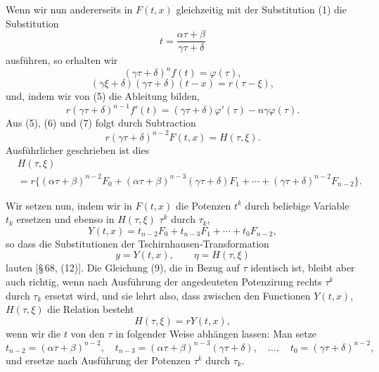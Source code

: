 \documentclass[11pt]{article}
\begin{document}
Wenn wir nun andererseits in $F(t,x)$ gleichzeitig mit der Substitution (1) die Substitution
\begin{equation}
 t=\frac{\alpha\tau+\beta}{\gamma\tau+\delta}
\tag{4}
\end{equation}
ausführen, so erhalten wir
\begin{equation}
 (\gamma\tau+\delta)^nf(t)=\varphi(\tau),
\tag{5}
\end{equation}
\begin{equation}
 (\gamma\xi+\delta)(\gamma\tau+\delta)(t-x)=r(\tau-\xi),
\tag{6}
\end{equation}
und, indem wir von (5) die Ableitung bilden,
\begin{equation}
 r(\gamma\tau+\delta)^{n-1}f'(t)=(\gamma\tau+\delta)\varphi'(\tau)-n\gamma\varphi(\tau).
\tag{7}
\end{equation}
Aus (5), (6) und (7) folgt durch Subtraction
\begin{equation}
 r(\gamma\tau+\delta)^{n-2}F(t,x)=H(\tau,\xi).
\tag{8}
\end{equation}
Ausführlicher geschrieben ist dies
\begin{equation}
\begin{aligned}
&H(\tau,\xi)\\
&=r\{(\alpha\tau+\beta)^{n-2}F_0+(\alpha\tau+\beta)^{n-3}(\gamma\tau+\delta)F_1+\cdots+(\gamma\tau+\delta)^{n-2}F_{n-2}\}.
\end{aligned}
\tag{9}
\end{equation}

Wir setzen nun, indem wir in $F(t,x)$ die Potenzen $t^k$ durch beliebige Variable $t_k$ ersetzen und ebenso in $H(\tau,\xi)$ $\tau^k$ durch $\tau_k$,
\begin{equation}
 Y(t,x)=t_{n-2}F_0+t_{n-3}F_1+\cdots+t_0F_{n-2},
\tag{10}
\end{equation}
so dass die Substitutionen der Tschirnhausen-Transformation
\begin{equation}
 y=Y(t,x),
 \qquad
 \eta=H(\tau,\xi)
\tag{11}
\end{equation}
lauten [\S\,68, (12)]. Die Gleichung (9), die in Bezug auf $\tau$ identisch ist, bleibt aber auch richtig, wenn nach Ausführung der angedeuteten Potenzirung rechts $\tau^k$ durch $\tau_k$ ersetzt wird, und sie lehrt also, dass zwischen den Functionen $Y(t,x)$, $H(\tau,\xi)$ die Relation besteht
\begin{equation}
 H(\tau,\xi)=rY(t,x),
\tag{12}
\end{equation}
wenn wir die $t$ von den $\tau$ in folgender Weise abhängen lassen: Man setze
\begin{equation}
 t_{n-2}= (\alpha\tau+\beta)^{n-2},
 \quad
 t_{n-3}= (\alpha\tau+\beta)^{n-3}(\gamma\tau+\delta),
 \quad\ldots,
 \quad
 t_0=(\gamma\tau+\delta)^{n-2},
\tag{13}
\end{equation}
und ersetze nach Ausführung der Potenzen $\tau^k$ durch $\tau_k$.
\end{document}
